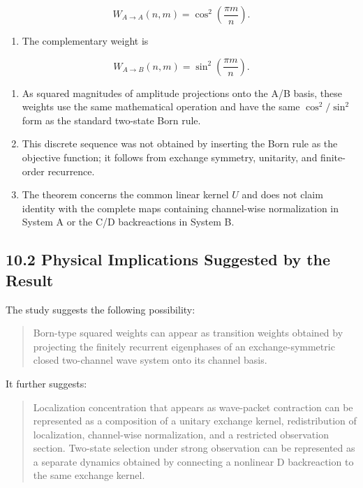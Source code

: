 \documentclass[
  a4paper,
  10pt]{article}
\providecommand{\tightlist}{%
  \setlength{\itemsep}{0pt}\setlength{\parskip}{0pt}}
\begin{document}
\[
W_{A\to A}(n,m)=\cos^2\left(\frac{\pi m}{n}\right).
\]

\begin{enumerate}
\def\labelenumi{\arabic{enumi}.}
\setcounter{enumi}{4}
\tightlist
\item
  The complementary weight is
\end{enumerate}

\[
W_{A\to B}(n,m)=\sin^2\left(\frac{\pi m}{n}\right).
\]

\begin{enumerate}
\def\labelenumi{\arabic{enumi}.}
\setcounter{enumi}{5}
\item
  As squared magnitudes of amplitude projections onto the A/B basis,
  these weights use the same mathematical operation and have the same
  \(\cos^2/\sin^2\) form as the standard two-state Born rule.
\item
  This discrete sequence was not obtained by inserting the Born rule as
  the objective function; it follows from exchange symmetry, unitarity,
  and finite-order recurrence.
\item
  The theorem concerns the common linear kernel \(U\) and does not claim
  identity with the complete maps containing channel-wise normalization
  in System A or the C/D backreactions in System B.
\end{enumerate}

\subsection{10.2 Physical Implications Suggested by the
Result}\label{102-physical-implications-suggested-by-the-result}

The study suggests the following possibility:

\begin{quote}
Born-type squared weights can appear as transition weights obtained by
projecting the finitely recurrent eigenphases of an exchange-symmetric
closed two-channel wave system onto its channel basis.
\end{quote}

It further suggests:

\begin{quote}
Localization concentration that appears as wave-packet contraction can
be represented as a composition of a unitary exchange kernel,
redistribution of localization, channel-wise normalization, and a
restricted observation section. Two-state selection under strong
observation can be represented as a separate dynamics obtained by
connecting a nonlinear D backreaction to the same exchange kernel.
\end{quote}
\end{document}
